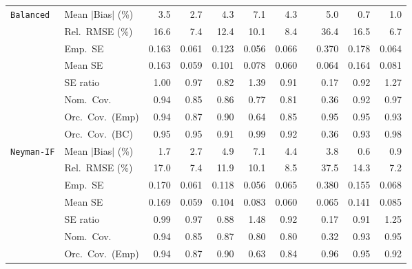 \begin{landscape}
\begin{longtable}{llrrrrrrrrr}
\addlinespace[2pt]
\quad \texttt{Balanced} & Mean $|$Bias$|$ (\%) & 3.5 & \cellcolor{rankthree}2.7 & 4.3 & 7.1 & 4.3 &  & 5.0 & \cellcolor{rankone}0.7 & \cellcolor{ranktwo}1.0 \\
 & Rel.\ RMSE (\%) & 16.6 & \cellcolor{ranktwo}7.4 & 12.4 & 10.1 & \cellcolor{rankthree}8.4 &  & 36.4 & 16.5 & \cellcolor{rankone}6.7 \\
 & Emp.\ SE & 0.163 & 0.061 & 0.123 & 0.056 & 0.066 &  & 0.370 & 0.178 & 0.064 \\
 & Mean SE & 0.163 & 0.059 & 0.101 & 0.078 & 0.060 &  & 0.064 & 0.164 & 0.081 \\
 & SE ratio & \cellcolor{rankone}1.00 & \cellcolor{ranktwo}0.97 & 0.82 & 1.39 & 0.91 &  & 0.17 & \cellcolor{rankthree}0.92 & 1.27 \\
 & Nom.\ Cov. & \cellcolor{rankone}0.94 & 0.85 & 0.86 & 0.77 & 0.81 &  & 0.36 & \cellcolor{rankthree}0.92 & \cellcolor{ranktwo}0.97 \\
 & Orc.\ Cov.\ (Emp) & \cellcolor{ranktwo}0.94 & 0.87 & 0.90 & 0.64 & 0.85 &  & \cellcolor{rankone}0.95 & \cellcolor{rankone}0.95 & \cellcolor{rankthree}0.93 \\
 & Orc.\ Cov.\ (BC) & \cellcolor{rankone}0.95 & \cellcolor{rankone}0.95 & 0.91 & 0.99 & \cellcolor{rankthree}0.92 &  & 0.36 & \cellcolor{ranktwo}0.93 & \cellcolor{rankthree}0.98 \\
\addlinespace[2pt]
\quad \texttt{Neyman-IF} & Mean $|$Bias$|$ (\%) & \cellcolor{rankthree}1.7 & 2.7 & 4.9 & 7.1 & 4.4 &  & 3.8 & \cellcolor{rankone}0.6 & \cellcolor{ranktwo}0.9 \\
 & Rel.\ RMSE (\%) & 17.0 & \cellcolor{ranktwo}7.4 & 11.9 & 10.1 & \cellcolor{rankthree}8.5 &  & 37.5 & 14.3 & \cellcolor{rankone}7.2 \\
 & Emp.\ SE & 0.170 & 0.061 & 0.118 & 0.056 & 0.065 &  & 0.380 & 0.155 & 0.068 \\
 & Mean SE & 0.169 & 0.059 & 0.104 & 0.083 & 0.060 &  & 0.065 & 0.141 & 0.085 \\
 & SE ratio & \cellcolor{rankone}0.99 & \cellcolor{ranktwo}0.97 & 0.88 & 1.48 & \cellcolor{rankthree}0.92 &  & 0.17 & 0.91 & 1.25 \\
 & Nom.\ Cov. & \cellcolor{rankone}0.94 & 0.85 & \cellcolor{rankthree}0.87 & 0.80 & 0.80 &  & 0.32 & \cellcolor{ranktwo}0.93 & \cellcolor{rankone}0.95 \\
 & Orc.\ Cov.\ (Emp) & \cellcolor{ranktwo}0.94 & 0.87 & 0.90 & 0.63 & 0.84 &  & \cellcolor{ranktwo}0.96 & \cellcolor{rankone}0.95 & \cellcolor{rankthree}0.92 \\

\end{longtable}
\end{landscape}
